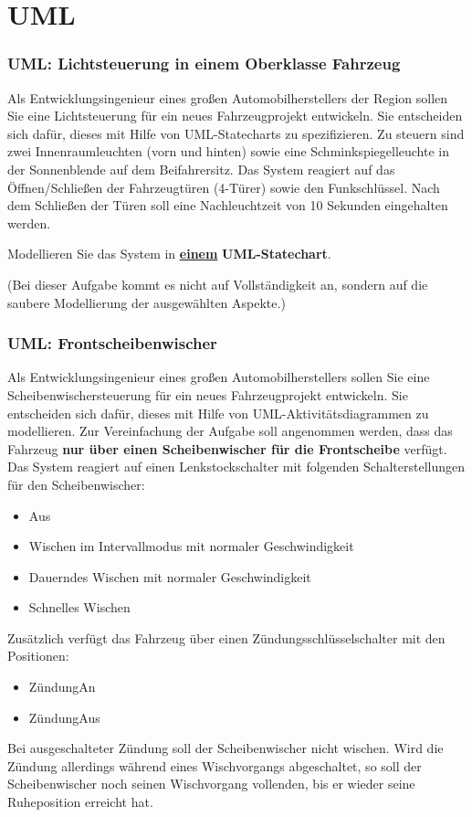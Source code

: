 \setcounter{section}{0}
\part{UML}
\section{UML: Lichtsteuerung in einem Oberklasse Fahrzeug}
Als Entwicklungsingenieur eines großen Automobilherstellers der Region sollen Sie eine Lichtsteuerung für ein neues Fahrzeugprojekt entwickeln. Sie entscheiden sich dafür, dieses mit Hilfe von UML-Statecharts zu spezifizieren. Zu steuern sind zwei Innenraumleuchten (vorn und hinten) sowie eine Schminkspiegelleuchte in der Sonnenblende auf dem Beifahrersitz. Das System reagiert auf das Öffnen/Schließen der Fahrzeugtüren (4-Türer) sowie den Funkschlüssel. Nach dem Schließen der Türen soll eine Nachleuchtzeit von 10 Sekunden eingehalten werden.

Modellieren Sie das System in \underline{\textbf{einem}} \textbf{UML-Statechart}.

(Bei dieser Aufgabe kommt es nicht auf Vollständigkeit an, sondern auf die saubere Modellierung der ausgewählten Aspekte.)

\section{UML: Frontscheibenwischer}
Als Entwicklungsingenieur eines großen Automobilherstellers sollen Sie eine Scheibenwischersteuerung für ein neues Fahrzeugprojekt entwickeln. Sie entscheiden sich dafür, dieses mit Hilfe von UML-Aktivitätsdiagrammen zu modellieren. Zur Vereinfachung der Aufgabe soll angenommen werden, dass das Fahrzeug \textbf{nur über einen Scheibenwischer für die Frontscheibe} verfügt. Das System reagiert auf einen Lenkstockschalter mit folgenden Schalterstellungen für den Scheibenwischer:
\begin{itemize}
    \item Aus
    \item Wischen im Intervallmodus mit normaler Geschwindigkeit
    \item Dauerndes Wischen mit normaler Geschwindigkeit
    \item Schnelles Wischen
\end{itemize}
Zusätzlich verfügt das Fahrzeug über einen Zündungsschlüsselschalter mit den Positionen:
\begin{itemize}
    \item ZündungAn
    \item ZündungAus
\end{itemize}
Bei ausgeschalteter Zündung soll der Scheibenwischer nicht wischen. Wird die Zündung allerdings während eines Wischvorgangs abgeschaltet, so soll der Scheibenwischer noch seinen Wischvorgang vollenden, bis er wieder seine Ruheposition erreicht hat.

